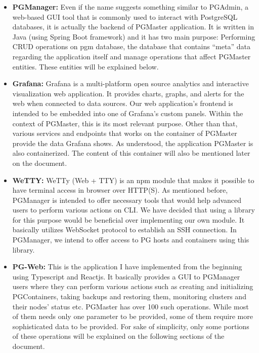 \begin{itemize}
    \item \textbf{PGManager:} Even if the name suggests something similar to 
    PGAdmin, a web-based GUI tool that is commonly used to interact with 
    PostgreSQL databases, it is actually the backend of PGMaster application. 
    It is written in Java (using Spring Boot framework) and it has two main 
    purpose: Performing CRUD operations on pgm database, the database that 
    contains ``meta'' data regarding the application itself and manage 
    operations that affect PGMaster entities. These entities will be 
    explained below.
    \item \textbf{Grafana:} Grafana is a multi-platform open source analytics 
    and interactive visualization web application. It provides charts, 
    graphs, and alerts for the web when connected to data sources. Our 
    web application's frontend is intended to be embedded into one of 
    Grafana's custom panels. Within the context of PGMaster, this is its 
    most relevant purpose. Other than that, various services and endpoints 
    that works on the container of PGMaster provide the data Grafana shows. 
    As understood, the application PGMaster is also containerized. The 
    content of this container will also be mentioned later on the document.
    \item \textbf{WeTTY:} WeTTy (Web + TTY) is an npm module that makes it 
    possible to have terminal access in browser over HTTP(S). As mentioned 
    before, PGManager is intended to offer necessary tools that would help 
    advanced users to perform various actions on CLI. We have decided that 
    using a library for this purpose would be beneficial over implementing 
    our own module. It basically utilizes WebSocket protocol to establish 
    an SSH connection. In PGManager, we intend to offer access to PG hosts 
    and containers using this library.
    \item \textbf{PG-Web:} This is the application I have implemented from 
    the beginning using Typescript and Reactjs. It basically provides a 
    GUI to PGManager users where they can perform various actions such as 
    creating and initializing PGContainers, taking backups and restoring 
    them, monitoring clusters and their nodes' status etc. PGMaster has 
    over 100 such operations. While most of them needs only one parameter 
    to be provided, some of them require more sophisticated data to be 
    provided. For sake of simplicity, only some portions of these operations 
    will be explained on the following sections of the document.
\end{itemize}

